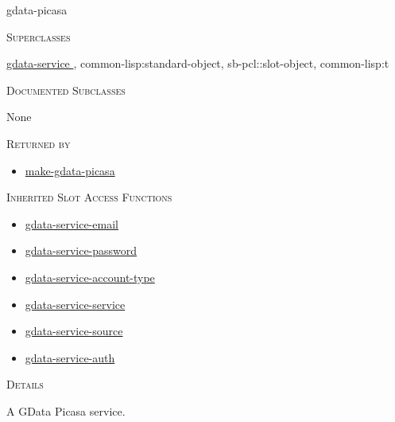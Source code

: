 \documentclass[a4paper]{report}
\begin{document}
    \label{cl-gdata-picasa__class__gdata-picasa}
    \begin{defun}[Class]
    gdata-picasa


      
    \bigskip
    \textsc{Superclasses}

\hyperref[cl-gdata-service__class__gdata-service]{
	  gdata-service
	}
      , \color[rgb]{0.5,0.5,0.5}common-lisp:standard-object\color[rgb]{0,0,0}, \color[rgb]{0.5,0.5,0.5}sb-pcl::slot-object\color[rgb]{0,0,0}, \color[rgb]{0.5,0.5,0.5}common-lisp:t\color[rgb]{0,0,0}


      
    \bigskip
    \textsc{Documented Subclasses}


	    None
	  


      
    \bigskip
    \textsc{Returned by}


 	
    \begin{itemize}
    
	  
    \item
    \hyperref[cl-gdata-picasa__fun__make-gdata-picasa]{make-gdata-picasa}
    
	
    \end{itemize}
  
      


      
    \bigskip
    \textsc{Inherited Slot Access Functions}


	
    \begin{itemize}
    
	  
    \item
    \hyperref[cl-gdata-service__fun__gdata-service-email]{gdata-service-email}
    
    \item
    \hyperref[cl-gdata-service__fun__gdata-service-password]{gdata-service-password}
    
    \item
    \hyperref[cl-gdata-service__fun__gdata-service-account-type]{gdata-service-account-type}
    
    \item
    \hyperref[cl-gdata-service__fun__gdata-service-service]{gdata-service-service}
    
    \item
    \hyperref[cl-gdata-service__fun__gdata-service-source]{gdata-service-source}
    
    \item
    \hyperref[cl-gdata-service__fun__gdata-service-auth]{gdata-service-auth}
    
	
    \end{itemize}
  
      


	
    \bigskip
    \textsc{Details}

A GData Picasa service.


    
    \end{defun}
  
\end{document}
